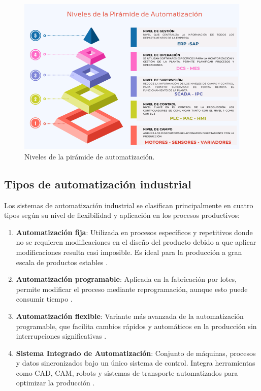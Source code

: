 \begin{figure} [h!]
  \begin{center}
    \includegraphics[width=15.5cm]{figs/esquema_automatizacion}
  \end{center}
  \caption{\centering Niveles de la pirámide de automatización. \cite{imagen_niveles_automatizacion}}  
  \label{fig:esquema_automatizacion}
\end{figure}  

\newpage

\subsection{Tipos de automatización industrial}

Los sistemas de automatización industrial se clasifican principalmente en cuatro tipos según su nivel de flexibilidad y aplicación en los procesos productivos:

\begin{enumerate}
    \item \textbf{Automatización fija}: Utilizada en procesos específicos y repetitivos donde no se requieren modificaciones en el diseño del producto debido a que aplicar modificaciones resulta casi imposible. Es ideal para la producción a gran escala de productos estables \cite{tipos_industrial}.
    \item \textbf{Automatización programable}: Aplicada en la fabricación por lotes, permite modificar el proceso mediante reprogramación, aunque esto puede consumir tiempo \cite{tipos_industrial}.
    \item \textbf{Automatización flexible}: Variante más avanzada de la automatización programable, que facilita cambios rápidos y automáticos en la producción sin interrupciones significativas \cite{tipos_industrial}.
    \newpage
    \item \textbf{Sistema Integrado de Automatización}: Conjunto de máquinas, procesos y datos sincronizados bajo un único sistema de control. Integra herramientas como CAD, CAM, robots y sistemas de transporte automatizados para optimizar la producción \cite{tipos_industrial}.
\end{enumerate}


